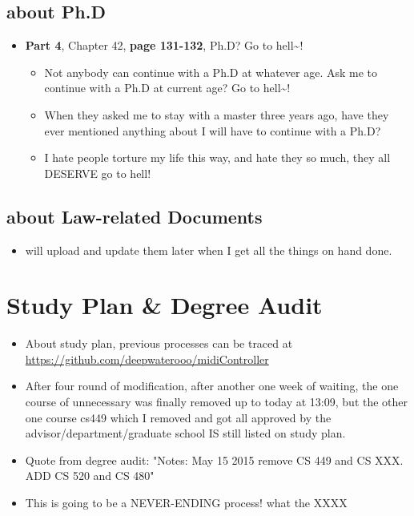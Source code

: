 \documentclass[9pt,b5paper]{article}
\begin{document}
\subsection{about Ph.D}
\label{sec-4-1}
\begin{itemize}
\item \textbf{Part 4}, Chapter 42, \textbf{page 131-132}, Ph.D? Go to hell\textasciitilde{}!
\begin{itemize}
\item Not anybody can continue with a Ph.D at whatever age. Ask me to continue with a Ph.D at current age? Go to hell\textasciitilde{}!
\item When they asked me to stay with a master three years ago, have they ever mentioned anything about I will have to continue with a Ph.D?
\item I hate people torture my life this way, and hate they so much, they all DESERVE go to hell!
\end{itemize}
\end{itemize}
\subsection{about Law-related Documents}
\label{sec-4-2}
\begin{itemize}
\item will upload and update them later when I get all the things on hand done.
\end{itemize}

\section{Study Plan \& Degree Audit}
\label{sec-5}
\begin{itemize}
\item About study plan, previous processes can be traced at \url{https://github.com/deepwaterooo/midiController}
\item After four round of modification, after another one week of waiting, the one course of unnecessary was finally removed up to today at 13:09, but the other one course cs449 which I removed and got all approved by the advisor/department/graduate school IS still listed on study plan.
\item Quote from degree audit: "Notes: May 15 2015 remove CS 449 and CS XXX. ADD CS 520 and CS 480"
\item This is going to be a NEVER-ENDING process! what the XXXX
\end{itemize}
\end{document}
